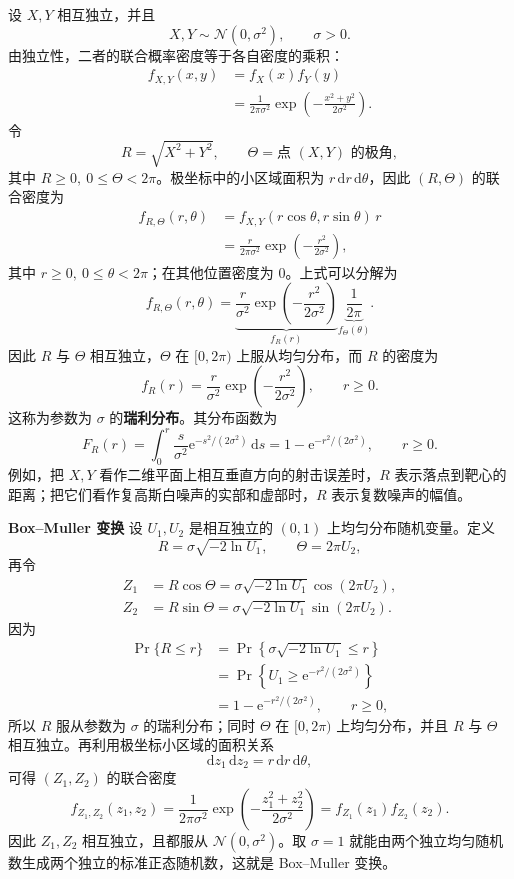 \documentclass[fontset=fandol]{ctexart}
\newenvironment{extra}{\begin{mdframed}[style=extrastyle, frametitle={* 选读内容（不要求掌握）}]}{\end{mdframed}}
\newenvironment{custom}[1]{\par\noindent\textbf{#1}\quad}{\par\vspace{0.8em}}
\newcommand{\dd}{\mathrm{d}}
\newcommand{\ee}{\mathrm{e}}
\begin{document}
\begin{extra}
\begin{example}
设 $X,Y$ 相互独立，并且
\[
X,Y\sim\mathcal N(0,\sigma^2),\qquad \sigma>0.
\]
由独立性，二者的联合概率密度等于各自密度的乘积：
\[
\begin{aligned}
f_{X,Y}(x,y)
&=f_X(x)f_Y(y)\\
&=\frac{1}{2\pi\sigma^2}
\exp\left(-\frac{x^2+y^2}{2\sigma^2}\right).
\end{aligned}
\]
令
\[
R=\sqrt{X^2+Y^2},\qquad
\Theta=\text{点 $(X,Y)$ 的极角},
\]
其中 $R\geq0,\ 0\leq\Theta<2\pi$。极坐标中的小区域面积为 $r\,\dd r\,\dd\theta$，因此 $(R,\Theta)$ 的联合密度为
\[
\begin{aligned}
f_{R,\Theta}(r,\theta)
&=f_{X,Y}(r\cos\theta,r\sin\theta)\,r\\
&=\frac{r}{2\pi\sigma^2}
\exp\left(-\frac{r^2}{2\sigma^2}\right),
\end{aligned}
\]
其中 $r\geq0,\ 0\leq\theta<2\pi$；在其他位置密度为 $0$。上式可以分解为
\[
f_{R,\Theta}(r,\theta)
=\underbrace{\frac{r}{\sigma^2}
\exp\left(-\frac{r^2}{2\sigma^2}\right)}_{f_R(r)}
\underbrace{\frac{1}{2\pi}}_{f_\Theta(\theta)}.
\]
因此 $R$ 与 $\Theta$ 相互独立，$\Theta$ 在 $[0,2\pi)$ 上服从均匀分布，而 $R$ 的密度为
\[
\boxed{f_R(r)=\frac{r}{\sigma^2}
\exp\left(-\frac{r^2}{2\sigma^2}\right),\qquad r\geq0}.
\]
这称为参数为 $\sigma$ 的\textbf{瑞利分布}。其分布函数为
\[
F_R(r)
=\int_0^r\frac{s}{\sigma^2}
\ee^{-s^2/(2\sigma^2)}\,\dd s
=1-\ee^{-r^2/(2\sigma^2)},\qquad r\geq0.
\]
例如，把 $X,Y$ 看作二维平面上相互垂直方向的射击误差时，$R$ 表示落点到靶心的距离；把它们看作复高斯白噪声的实部和虚部时，$R$ 表示复数噪声的幅值。
\end{example}

\begin{custom}{Box--Muller 变换}
设 $U_1,U_2$ 是相互独立的 $(0,1)$ 上均匀分布随机变量。定义
\[
R=\sigma\sqrt{-2\ln U_1},\qquad
\Theta=2\pi U_2,
\]
再令
\[
\boxed{
\begin{aligned}
Z_1&=R\cos\Theta
=\sigma\sqrt{-2\ln U_1}\cos(2\pi U_2),\\
Z_2&=R\sin\Theta
=\sigma\sqrt{-2\ln U_1}\sin(2\pi U_2).
\end{aligned}}
\]
因为
\[
\begin{aligned}
\Pr\{R\leq r\}
&=\Pr\left\{\sigma\sqrt{-2\ln U_1}\leq r\right\}\\
&=\Pr\left\{U_1\geq
\ee^{-r^2/(2\sigma^2)}\right\}\\
&=1-\ee^{-r^2/(2\sigma^2)},\qquad r\geq0,
\end{aligned}
\]
所以 $R$ 服从参数为 $\sigma$ 的瑞利分布；同时 $\Theta$ 在 $[0,2\pi)$ 上均匀分布，并且 $R$ 与 $\Theta$ 相互独立。再利用极坐标小区域的面积关系
\[
\dd z_1\,\dd z_2=r\,\dd r\,\dd\theta,
\]
可得 \((Z_1,Z_2)\) 的联合密度
\[
f_{Z_1,Z_2}(z_1,z_2)
=\frac{1}{2\pi\sigma^2}
\exp\left(-\frac{z_1^2+z_2^2}{2\sigma^2}\right)
=f_{Z_1}(z_1)f_{Z_2}(z_2).
\]
因此 $Z_1,Z_2$ 相互独立，且都服从 $\mathcal N(0,\sigma^2)$。取 $\sigma=1$ 就能由两个独立均匀随机数生成两个独立的标准正态随机数，这就是 Box--Muller 变换。
\end{custom}

\end{extra}
\end{document}
